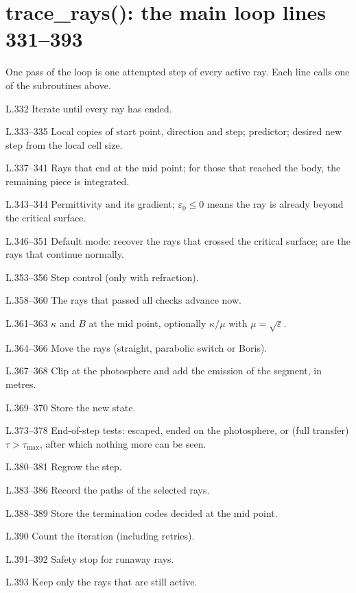 \section*{\normalsize trace\_rays(): the main loop \hfill{\small\mdseries\color{gray}lines 331--393}}

One pass of the loop is one attempted step of every active ray. Each line calls one of the subroutines above.

\begin{lines}
\item[L.332] Iterate until every ray has ended.
\item[L.333–335] Local copies of start point, direction and step; predictor; desired new step from the local cell size.
\item[L.337–341] Rays that end at the mid point; for those that reached the body, the remaining piece is integrated.
\item[L.343–344] Permittivity and its gradient; $\varepsilon_0\le0$ means the ray is already beyond the critical surface.
\item[L.346–351] Default mode: recover the rays that crossed the critical surface;  are the rays that continue normally.
\item[L.353–356] Step control (only with refraction).
\item[L.358–360] The rays that passed all checks advance now.
\item[L.361–363] $\kappa$ and $B$ at the mid point, optionally $\kappa/\mu$ with $\mu=\sqrt\varepsilon$.
\item[L.364–366] Move the rays (straight, parabolic switch or Boris).
\item[L.367–368] Clip at the photosphere and add the emission of the segment, in metres.
\item[L.369–370] Store the new state.
\item[L.373–378] End-of-step tests: escaped, ended on the photosphere, or (full transfer) $\tau>\tau_\text{max}$, after which nothing more can be seen.
\item[L.380–381] Regrow the step.
\item[L.383–386] Record the paths of the selected rays.
\item[L.388–389] Store the termination codes decided at the mid point.
\item[L.390] Count the iteration (including retries).
\item[L.391–392] Safety stop for runaway rays.
\item[L.393] Keep only the rays that are still active.
\end{lines}
